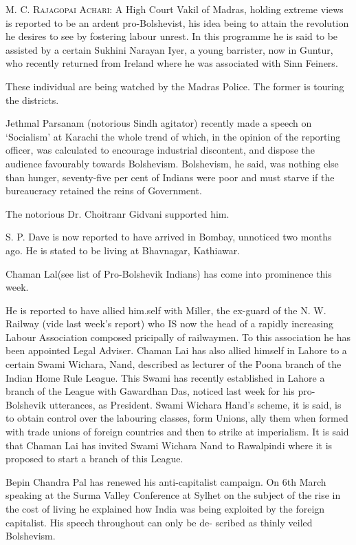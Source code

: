 \textsc{M. C. Rajagopai Achari:} A High Court Vakil of Madras, holding extreme views is reported to be an ardent pro-Bolshevist, his idea being to attain the revolution he desires to see by fostering labour unrest. In this programme he is said to be assisted by a certain Sukhini Narayan Iyer, a young barrister, now in Guntur, who recently returned from Ireland where he was associated with Sinn Feiners. 

These individual are being watched by the Madras Police. The former is touring the districts. 

Jethmal Parsanam (notorious Sindh agitator) recently made a speech on ‘Socialism’ at Karachi the whole trend of which, in the opinion of the reporting officer, was calculated to encourage industrial discontent, and dispose the audience favourably towards Bolshevism. Bolshevism, he said, was nothing else than hunger, seventy-five per cent of Indians were poor and must starve if the bureaucracy retained the reins of Government. 

The notorious Dr. Choitranr Gidvani supported him. 

S. P. Dave is now reported to have arrived in Bombay, unnoticed two months ago. He is stated to be living at Bhavnagar, Kathiawar. 

Chaman Lal(see list of Pro-Bolshevik Indians) has come into prominence this week. 

He is reported to have allied him.self with Miller, the ex-guard of the N. W. Railway (vide last week’s report) who IS now the head of a rapidly increasing Labour Association composed pricipally of railwaymen. To this association he has been appointed Legal Adviser. Chaman 
Lai has also allied himself in Lahore to a certain Swami Wichara, Nand, described as lecturer of the Poona branch of the Indian Home Rule League. This Swami has recently established in Lahore a branch of the League with Gawardhan Das, noticed last week for his pro-Bolshevik utterances, as President. Swami Wichara Hand’s scheme, it is said, is to obtain control over the labouring classes, form Unions, ally 
them when formed with trade unions of foreign countries and then to strike at imperialism. It is said that Chaman Lai has invited Swami Wichara Nand to Rawalpindi where it is proposed to start a branch of this League. 

Bepin Chandra Pal has renewed his anti-capitalist campaign. On 6th March speaking at the Surma Valley Conference at Sylhet on the subject of the rise in the cost of living he explained how India was being exploited by the foreign capitalist. His speech throughout can only be de- 
scribed as thinly veiled Bolshevism. 

